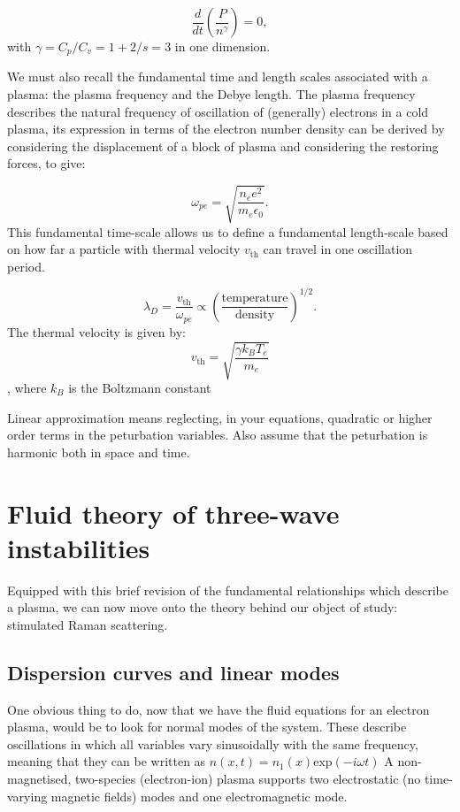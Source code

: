 \begin{equation}
\frac{d}{dt}\left(\frac{P}{n^{\gamma}}\right) = 0,
\end{equation} with $\gamma = C_p/C_v = 1 + 2/s = 3$ in one dimension. 

We must also recall the fundamental time and length scales associated with a plasma: the plasma frequency and the Debye length. The plasma frequency describes the natural frequency of oscillation of (generally) electrons in a cold plasma, its expression in terms of the electron number density can be derived by considering the displacement of a block of plasma and considering the restoring forces, to give:

\begin{equation}
	\omega_{pe} = \sqrt{\frac{n_e e^2}{m_e \epsilon_0}}.
\end{equation} This fundamental time-scale allows us to define a fundamental length-scale based on how far a particle with thermal velocity $v_{\text{th}}$ can travel in one oscillation period.

\begin{equation}
	\lambda_D = \frac{v_{\mathrm{th}}}{\omega_{pe}} \propto \left(\frac{\mathrm{temperature}}{\mathrm{density}}\right)^{1/2}.
\end{equation}\label{eqn:debye} The thermal velocity is given by:
\begin{equation}
	v_{\text{th}} = \sqrt{\frac{\gamma k_BT_e}{m_e}}
\end{equation}\label{eqn:vth}, where $k_B$ is the Boltzmann constant

Linear approximation means reglecting, in your equations, quadratic or higher order terms in the peturbation variables. Also assume that the peturbation is harmonic both in space and time.
\section{Fluid theory of three-wave instabilities}
Equipped with this brief revision of the fundamental relationships which describe a plasma, we can now move onto the theory behind our object of study: stimulated Raman scattering.

\subsection{Dispersion curves and linear modes}

One obvious thing to do, now that we have the fluid equations for an electron plasma, would be to look for normal modes of the system. These describe oscillations in which all variables vary sinusoidally with the same frequency, meaning that they can be written as $n(x,t) = n_1(x)\text{exp}(-i\omega t)$
A non-magnetised, two-species (electron-ion) plasma supports two electrostatic (no time-varying magnetic fields) modes and one electromagnetic mode. 

